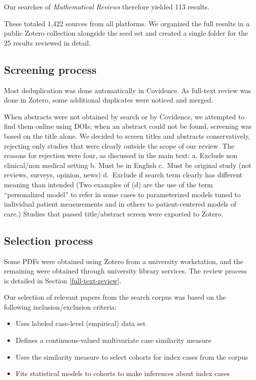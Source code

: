 \documentclass[sn-mathphys,Numbered,pdflatex]{sn-jnl}
\theoremstyle{remark}
\theoremstyle{definition}
\providecommand{\tightlist}{%
  \setlength{\itemsep}{0pt}\setlength{\parskip}{0pt}}
\begin{document}
Our searches of \emph{Mathematical Reviews} therefore yielded 113
results.

These totaled 1,422 sources from all platforms. We organized the full
results in a public Zotero collection alongside the seed set and created
a single folder for the 25 results reviewed in detail.

\subsection*{Screening process}\label{screening-process}

Most deduplication was done automatically in Covidence. As full-text
review was done in Zotero, some additional duplicates were noticed and
merged.

When abstracts were not obtained by search or by Covidence, we attempted
to find them online using DOIs; when an abstract could not be found,
screening was based on the title alone. We decided to screen titles and
abstracts conservatively, rejecting only studies that were clearly
outside the scope of our review. The reasons for rejection were four, as
discussed in the main text: a. Exclude non clinical/non medical setting
b. Must be in English c.~Must be original study (not reviews, surveys,
opinion, news) d.~Exclude if search term clearly has different meaning
than intended (Two examples of (d) are the use of the term
``personalized model'' to refer in some cases to parameterized models
tuned to individual patient measurements and in others to
patient-centered models of care.) Studies that passed title/abstract
screen were exported to Zotero.

\subsection*{Selection process}\label{selection-process}

Some PDFs were obtained using Zotero from a university workstation, and
the remaining were obtained through university library services. The
review process is detailed in Section \ref{full-text-review}.

Our selection of relevant papers from the search corpus was based on the
following inclusion/exclusion criteria:

\begin{itemize}
\tightlist
\item
  Uses labeled case-level (empirical) data set
\item
  Defines a continuous-valued multivariate case similarity measure
\item
  Uses the similarity measure to select cohorts for index cases from the
  corpus
\item
  Fits statistical models to cohorts to make inferences about index
  cases
\end{itemize}
\end{document}
